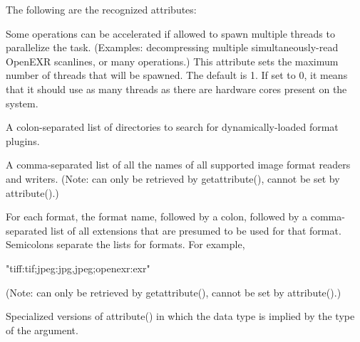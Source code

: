 \noindent The following are the recognized attributes:

\vspace{10pt}
 \label{sec:attribute:threads}
Some \product operations can be accelerated if allowed to spawn multiple
threads to parallelize the task.  (Examples: decompressing multiple
simultaneously-read OpenEXR scanlines, or many \ImageBuf operations.)
This attribute sets the maximum number of threads that will be spawned.
The default is 1.  If set to 0, it means that it should use as many
threads as there are hardware cores present on the system.
\apiend

\vspace{10pt}
A colon-separated list of directories to search for 
dynamically-loaded format plugins.
\apiend

\vspace{10pt}
A comma-separated list of all the names of all supported 
image format readers and writers.  (Note: can only be retrieved
by {\cf getattribute()}, cannot be set by {\cf attribute()}.)
\apiend

\vspace{10pt}
For each format, the format name, followed by a colon, followed by
a comma-separated list of all extensions that are presumed to be used
for that format.  Semicolons separate the lists for formats.  For
example,
\begin{code}
     "tiff:tif;jpeg:jpg,jpeg;openexr:exr"
\end{code}
(Note: can only be retrieved
by {\cf getattribute()}, cannot be set by {\cf attribute()}.)
\apiend

\apiend

Specialized versions of {\cf attribute()} in which the data type is
implied by the type of the argument.
\apiend




